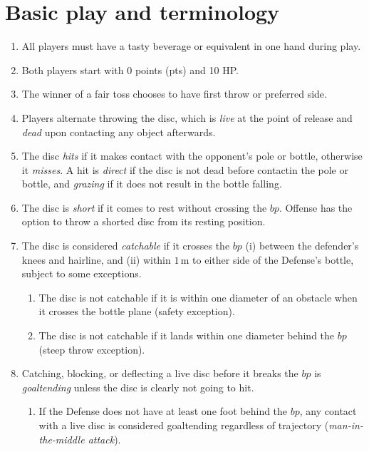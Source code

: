\documentclass[11pt,letterpaper,twocolumn,english,DIV=calc]{scrartcl}
\begin{document}
\section{Basic play and terminology}
\begin{enumerate}
	\item All players must have a tasty beverage or equivalent in one hand during play.
	\item Both players start with 0 points (pts) and 10 HP.
	\item \label{enu:fair_toss} The winner of a fair toss chooses to have first throw or preferred side.
	\item \label{enu:alternate_throws} Players alternate throwing the disc, which is \emph{live} at the point of release and \emph{dead} upon contacting any object afterwards.
	\item The disc \emph{hits} if it makes contact with the opponent's pole or bottle, otherwise it \emph{misses}.
	A hit is \emph{direct} if the disc is not dead before contactin the pole or bottle, and \emph{grazing} if it does not result in the bottle falling.

	\item The disc is \emph{short} if it comes to rest without crossing the $bp$. 
	Offense has the option to throw a shorted disc from its resting position. 
	
	\item The disc is considered \emph{catchable} if it crosses the $bp$ (i) between the defender's knees and hairline, and (ii) within $1\,\mbox{m}$ to either side of the Defense's bottle, subject to some exceptions.
	\begin{enumerate}
		\item The disc is not catchable if it is within one diameter of an obstacle when it crosses the bottle plane (safety exception).
		\item The disc is not catchable if it lands within one diameter behind the $bp$ (steep throw exception).
	\end{enumerate}

	\item Catching, blocking, or deflecting a live disc before it breaks the $bp$ is \emph{goaltending} unless the disc is clearly not going to hit.
		\begin{enumerate}
		\item If the Defense does not have at least one foot behind the $bp$, any contact with a live disc is considered goaltending regardless of trajectory (\emph{man-in-the-middle attack}).
	\end{enumerate}
\end{enumerate}
\end{document}
